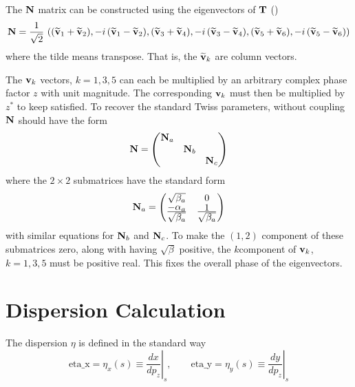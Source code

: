 The ${\bf N}$ matrix can be constructed using the eigenvectors of ${\bf T}$ ()
\begin{equation}
  {\bf N} = \frac{1}{\sqrt{2}} \, \left( 
    (\widetilde{{\bf v}}_1 + \widetilde{{\bf v}}_2), -i \, (\widetilde{{\bf v}}_1 - \widetilde{{\bf v}}_2), 
    (\widetilde{{\bf v}}_3 + \widetilde{{\bf v}}_4), -i \, (\widetilde{{\bf v}}_3 - \widetilde{{\bf v}}_4), 
    (\widetilde{{\bf v}}_5 + \widetilde{{\bf v}}_6), -i \, (\widetilde{{\bf v}}_5 - \widetilde{{\bf v}}_6)
  \right)
\end{equation}
where the tilde means transpose. That is, the $\widetilde{{\bf v}}_k$ are column vectors.

The ${\bf v}_k$ vectors, $k = 1, 3, 5$ can each be multiplied by an arbitrary complex phase factor $z$
with unit magnitude. The corresponding ${\bf v}_k$ must then be multiplied by $z^*$
to keep  satisfied. To recover the standard Twiss parameters, without coupling ${\bf N}$
should have the form
\begin{equation}
  {\bf N} = \begin{pmatrix}
    {\bf N}_a &        &        \\
           & {\bf N}_b &        \\
           &        & {\bf N}_c
  \end{pmatrix}
\end{equation}
where the $2 \times 2$ submatrices have the standard form
\begin{equation}
  {\bf N}_a = \begin{pmatrix}
    \sqrt{\beta_a}                                   & 0 \cr
    \frac{\textstyle -\alpha_a}{\textstyle \sqrt{\beta_a}} & \frac{\textstyle 1}{\textstyle \sqrt{\beta_a}}
  \end{pmatrix}
\end{equation}
with similar equations for ${\bf N}_b$ and ${\bf N}_c$. To make the $(1,2)$ component of these submatrices
zero, along with having $\sqrt{\beta}$ positive, the $k$\Th component of ${\bf v}_k$, $k = 1, 3, 5$
must be positive real. This fixes the overall phase of the eigenvectors.

\section{Dispersion Calculation}
\label{s:dispersion}

The dispersion $\eta$ is defined in the standard way
\begin{equation}
  \text{eta_x} = \eta_x(s) \equiv \left. \frac{dx}{dp_z} \right|_s \comma \qquad
  \text{eta_y} = \eta_y(s) \equiv \left. \frac{dy}{dp_z} \right|_s
  \label{eedxdpz}
\end{equation}

